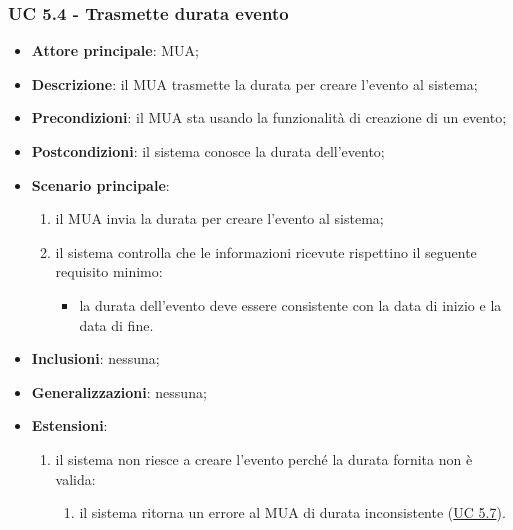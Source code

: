     \subsubsection{UC 5.4 - Trasmette durata evento} \label{sec:UC5.4}
    \begin{itemize}
        \item \textbf{Attore principale}: MUA;
        \item \textbf{Descrizione}: il MUA trasmette la durata per creare l'evento al sistema;
        \item \textbf{Precondizioni}: il MUA sta usando la funzionalità di creazione di un evento;
        \item \textbf{Postcondizioni}: il sistema conosce la durata dell'evento;
        \item \textbf{Scenario principale}:
            \begin{enumerate}
                \item il MUA invia la durata per creare l'evento al sistema;
                \item il sistema controlla che le informazioni ricevute rispettino il seguente requisito minimo:
                    \begin{itemize}
                        \item la durata dell'evento deve essere consistente con la data di inizio e la data di fine.
                    \end{itemize}
            \end{enumerate}
        \item \textbf{Inclusioni}: nessuna;
        \item \textbf{Generalizzazioni}: nessuna;
        \item \textbf{Estensioni}:
            \begin{enumerate}[label=\alph*.]
                \item il sistema non riesce a creare l'evento perché la durata fornita non è valida:
                \begin{enumerate}[label=\arabic*.]
                    \item il sistema ritorna un errore al MUA di durata inconsistente (\hyperref[sec:UC5.7]{UC 5.7}).
                \end{enumerate}
            \end{enumerate}
    \end{itemize}



